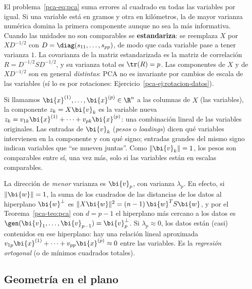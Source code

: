 \begin{remark}\label{pca-rem:estandarizar}
El problema~\eqref{pca-eq:pca} suma errores al cuadrado en todas las variables
por igual. Si una variable está en gramos y otra en kilómetros, la de mayor
varianza numérica domina la primera componente aunque no sea la más
informativa. Cuando las unidades no son comparables se \textbf{estandariza}:
se reemplaza $X$ por $X D^{-1/2}$ con $D=\diag(s_{11},\dots,s_{pp})$, de modo
que cada variable pase a tener varianza $1$. La covarianza de la matriz
estandarizada es la matriz de correlación $R=D^{-1/2}SD^{-1/2}$, y su
varianza total es $\tr(R)=p$. Las componentes de $X$ y de $XD^{-1/2}$ son en
general \emph{distintas}: PCA no es invariante por cambios de escala de las
variables (sí lo es por rotaciones: Ejercicio~\ref{pca-ej:rotacion-datos}).
\end{remark}

\begin{remark}
Si llamamos $\bi{x}^{(1)},\dots,\bi{x}^{(p)}\in\R^n$ a las columnas de $X$ (las
variables), la componente $z_k=X\bi{v}_k$ es la variable nueva
$z_k=v_{1k}\bi{x}^{(1)}+\dots+v_{pk}\bi{x}^{(p)}$: una combinación lineal de las
variables originales. Las entradas de $\bi{v}_k$
(\emph{pesos} o \emph{loadings}) dicen qué variables intervienen en la
componente y con qué signo; entradas grandes del mismo signo indican variables
que ``se mueven juntas''. Como $\|\bi{v}_k\|=1$, los pesos son comparables entre
sí, una vez más, solo si las variables están en escalas comparables.
\end{remark}

\begin{remark}
La dirección de \emph{menor} varianza es $\bi{v}_p$, con varianza $\lambda_p$. En
efecto, si $\|\bi{w}\|=1$, la suma de los cuadrados de las distancias de los datos
al hiperplano $\bi{w}^\perp$ es $\|X\bi{w}\|^2=(n-1)\,\bi{w}^T S\bi{w}$, y por el
Teorema~\ref{pca-teo:pca} con $d=p-1$ el hiperplano más cercano a los datos es
$\gen(\bi{v}_1,\dots,\bi{v}_{p-1})=\bi{v}_p^\perp$. Si $\lambda_p\approx0$, los datos están
(casi) contenidos en ese hiperplano: hay una relación lineal aproximada
$v_{1p}\bi{x}^{(1)}+\dots+v_{pp}\bi{x}^{(p)}\approx0$ entre las variables. Es la
\emph{regresión ortogonal} (o de mínimos cuadrados totales).
\end{remark}

\subsection{Geometría en el plano}

